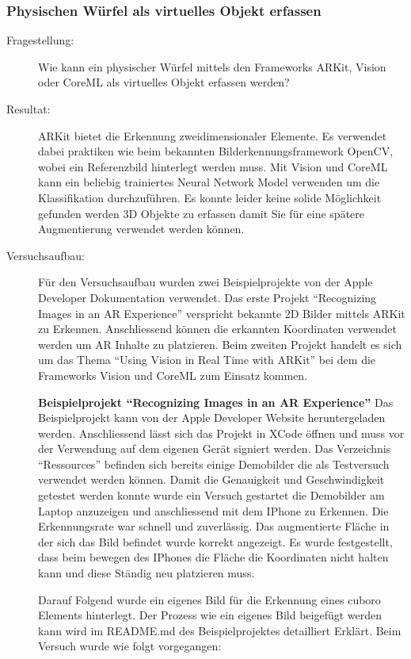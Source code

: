 \subsubsection{Physischen Würfel als virtuelles Objekt erfassen}\label{subsub:prot-physische-wuerfel}
\begin{description}
	\item[Fragestellung:] Wie kann ein physischer Würfel mittels den Frameworks ARKit, Vision oder CoreML als virtuelles Objekt erfassen werden?
	\item[Resultat:] ARKit bietet die Erkennung zweidimensionaler Elemente. Es verwendet dabei praktiken wie beim bekannten Bilderkennungsframework OpenCV, wobei ein Referenzbild hinterlegt werden muss.
	Mit Vision und CoreML kann ein beliebig trainiertes Neural Network Model verwenden um die Klassifikation durchzuführen. Es konnte leider keine solide Möglichkeit gefunden werden 3D Objekte zu erfassen damit Sie für eine spätere Augmentierung verwendet werden können. 
	\item[Versuchsaufbau:] Für den Versuchsaufbau wurden zwei Beispielprojekte von der Apple Developer Dokumentation verwendet. Das erste Projekt "`Recognizing Images in an AR Experience"' \cite{arkit-recognize-images} verspricht bekannte 2D Bilder mittels ARKit zu Erkennen. Anschliessend können die erkannten Koordinaten verwendet werden um AR Inhalte zu platzieren.
	Beim zweiten Projekt handelt es sich um das Thema "`Using Vision in Real Time with ARKit"' \cite{vision-real-time-with-arkit} bei dem die Frameworks Vision und CoreML zum Einsatz kommen.

	\textbf{Beispielprojekt "`Recognizing Images in an AR Experience"'}
	Das Beispielprojekt kann von der Apple Developer Website heruntergeladen werden. Anschliessend lässt sich das Projekt in XCode öffnen und muss vor der Verwendung auf dem eigenen Gerät signiert werden. Das Verzeichnis "`Ressources"' befinden sich bereits einige Demobilder die als Testversuch verwendet werden können. Damit die Genauigkeit und Geschwindigkeit getestet werden konnte wurde ein Versuch gestartet die Demobilder am Laptop anzuzeigen und anschliessend mit dem IPhone zu Erkennen. Die Erkennungsrate war schnell und zuverlässig. Das augmentierte Fläche in der sich das Bild befindet wurde korrekt angezeigt. Es wurde festgestellt, dass beim bewegen des IPhones die Fläche die Koordinaten nicht halten kann und diese Ständig neu platzieren muss.

	Darauf Folgend wurde ein eigenes Bild für die Erkennung eines cuboro Elements hinterlegt. Der Prozess wie ein eigenes Bild beigefügt werden kann wird im README.md des Beispielprojektes detailliert Erklärt. Beim Versuch wurde wie folgt vorgegangen: 


\end{description}
